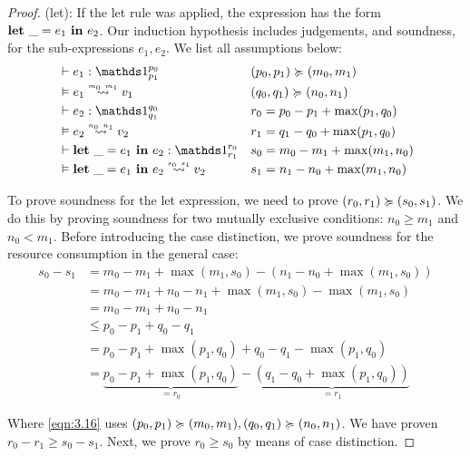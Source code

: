 \begin{proof}
   (let):  If the let rule was applied, the expression has the form \(\mathbf{let}~\_ = e_1~\mathbf{in}~e_2\). Our induction hypothesis includes judgements, and soundness, for the sub-expressions \(e_1, e_2\). We list all assumptions below:
   \begin{align*}
      &\typing{}{e_1}{\ratype{\unit}{p_0}{p_1}}                   & &(p_0, p_1)\relaxation (m_0, m_1)\\
      &\evals{}{e_1}{v_1}{m_0}{m_1}                               & &(q_0, q_1)\relaxation (n_0, n_1)\\
      &\typing{}{e_2}{\ratype{\unit}{q_0}{q_1}}                   & & r_0= p_0 - p_1 + \max(p_1, q_0) \\
      &\evals{}{e_2}{v_2}{n_0}{n_1}                               & & r_1= q_1 - q_0 + \max(p_1, q_0) \\
      &\typing{}{\letexp{\_}{e_1}{e_2}}{\ratype{\unit}{r_0}{r_1}} & & s_0= m_0 - m_1 + \max(m_1, n_0) \\
      &\evals{}{\letexp{\_}{e_1}{e_2}}{v_2}{s_0}{s_1}             & & s_1= n_1 - n_0 + \max(m_1, n_0) 
   \end{align*}
   
   To prove soundness for the let expression, we need to prove \((r_0, r_1) \succcurlyeq (s_0, s_1)\). We do this by proving soundness for two mutually exclusive conditions: \(n_0 \geq m_1\) and \(n_0 < m_1\). Before introducing the case distinction, we prove soundness for the resource consumption in the general case:
   \begin{align}
      s_0 - s_1   &= m_0 - m_1 + \max(m_1, s_0) - (n_1 - n_0 + \max(m_1, s_0)) \\
                  &= m_0 - m_1 + n_0 - n_1 + \max(m_1, s_0) - \max(m_1, s_0) \\
                  &= m_0 - m_1 + n_0 - n_1 \\
                  &\leq p_0 - p_1 + q_0 - q_1 \label{eqn:3.16}\\
                  &= p_0 - p_1 + \max(p_1, q_0) + q_0 - q_1 - \max(p_1, q_0) \\
                  &= \underbrace{p_0 - p_1 + \max(p_1, q_0)}_{= r_0} - \underbrace{(q_1 - q_0 + \max(p_1, q_0))}_{= r_1}
   \end{align}

   Where \cref{eqn:3.16} uses \((p_0, p_1) \succcurlyeq (m_0, m_1), (q_0, q_1) \succcurlyeq (n_0, n_1)\). We have proven \(r_0 - r_1 \geq s_0 - s_1\). Next, we prove \(r_0 \geq s_0\) by means of case distinction. 
   

\end{proof}
